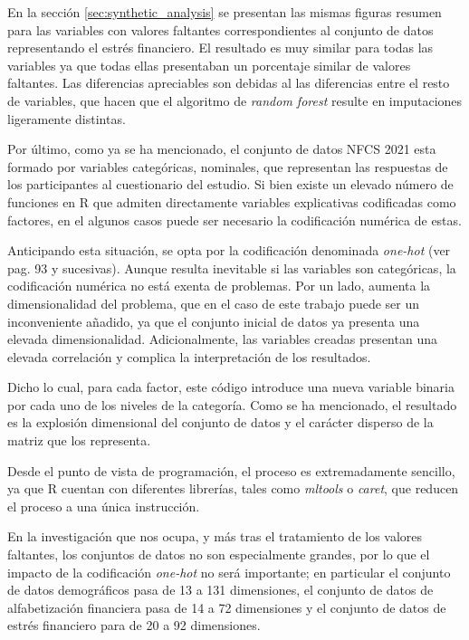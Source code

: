 \documentclass[a4paper, 11pt]{article}
\begin{document}
En la sección \ref{sec:synthetic_analysis} se presentan las mismas figuras resumen
para las variables con valores faltantes correspondientes al conjunto de datos 
representando el estrés financiero. El resultado es muy similar para todas las 
variables ya que todas ellas presentaban un porcentaje similar de valores faltantes.
Las diferencias apreciables son debidas al las diferencias entre el resto de variables,
que hacen que el algoritmo de \textit{random forest} resulte en imputaciones ligeramente distintas.

Por último, como ya se ha mencionado, el conjunto de datos NFCS 2021 esta formado por
variables categóricas, nominales, que representan las respuestas de los participantes
al cuestionario del estudio. Si bien existe un elevado número de funciones en R que 
admiten directamente variables explicativas codificadas como factores, en el algunos
casos puede ser necesario la codificación numérica de estas. 

Anticipando esta situación,
se opta por la codificación denominada \textit{one-hot} (ver \cite{lantz23} pag. 93 y 
sucesivas). Aunque resulta inevitable si las variables son categóricas, la codificación
numérica no está exenta de problemas. Por un lado, aumenta la dimensionalidad del
problema, que en el caso de este trabajo puede ser un inconveniente añadido, ya que
el conjunto inicial de datos ya presenta una elevada dimensionalidad. Adicionalmente, 
las variables creadas presentan una elevada correlación y complica la interpretación de
los resultados.

Dicho lo cual, para cada factor, este código introduce una nueva variable binaria
por cada uno de los niveles de la categoría. Como se ha mencionado, el resultado es
la explosión dimensional del conjunto de datos y el carácter disperso de la matriz
que los representa. 

Desde el punto de vista de programación, el proceso es extremadamente sencillo, ya que R cuentan con diferentes librerías, tales como \textit{mltools} o \textit{caret}, que reducen el proceso a una única instrucción.

En la investigación que nos ocupa, y más tras el tratamiento de los valores faltantes, los
conjuntos de datos no son especialmente grandes, por lo que el impacto de la codificación
\textit{one-hot} no será importante; en particular el conjunto de datos demográficos pasa
de 13 a 131 dimensiones, el conjunto de datos de alfabetización financiera pasa de 14 a 72
dimensiones y el conjunto de datos de estrés financiero para de 20 a 92 dimensiones.
\end{document}
